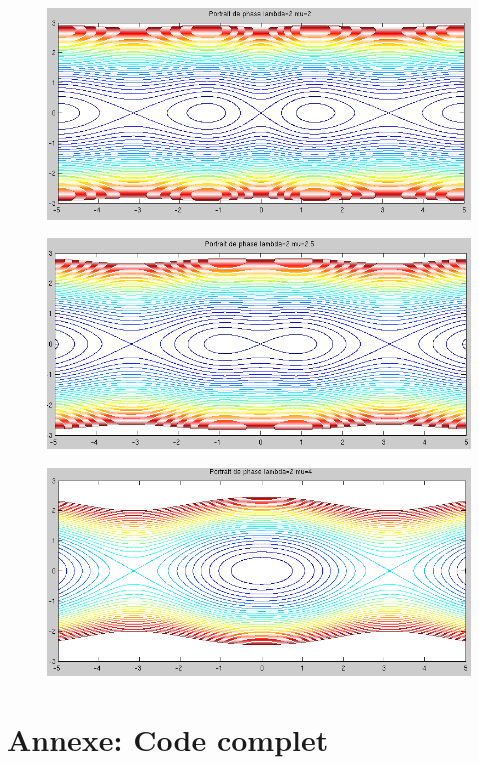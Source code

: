 \documentclass[11pt]{article}
\begin{document}
\begin{figure}[h!]
	\centering
	\includegraphics[scale=0.65]{Figures/rapport_pp20.png}
\end{figure}
\newpage %
\begin{figure}[h!]
	\centering
	\includegraphics[scale=0.66]{Figures/rapport_pp25.png}
\end{figure}
\newpage
\begin{figure}[h!]
	\centering
	\includegraphics[scale=0.65]{Figures/rapport_pp40.png}
\end{figure}


\newpage
\section{Annexe: Code complet}

\end{document}
